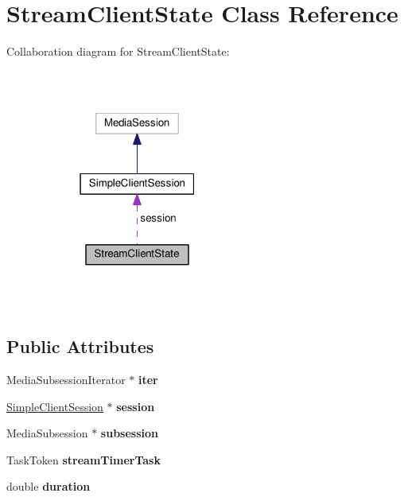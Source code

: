 \hypertarget{classStreamClientState}{}\section{Stream\+Client\+State Class Reference}
\label{classStreamClientState}


Collaboration diagram for Stream\+Client\+State\+:\nopagebreak
\begin{figure}[H]
\begin{center}
\leavevmode
\includegraphics[width=187pt]{classStreamClientState__coll__graph}
\end{center}
\end{figure}
\subsection*{Public Attributes}
\begin{DoxyCompactItemize}
\item 
Media\+Subsession\+Iterator $\ast$ {\bfseries iter}\hypertarget{classStreamClientState_aa21b46179817152e71673078ef8b1861}{}\label{classStreamClientState_aa21b46179817152e71673078ef8b1861}

\item 
\hyperlink{classSimpleClientSession}{Simple\+Client\+Session} $\ast$ {\bfseries session}\hypertarget{classStreamClientState_a01239436d89ee8c3866a711404d5f73a}{}\label{classStreamClientState_a01239436d89ee8c3866a711404d5f73a}

\item 
Media\+Subsession $\ast$ {\bfseries subsession}\hypertarget{classStreamClientState_a9537edef807552dd72e8680e59945b19}{}\label{classStreamClientState_a9537edef807552dd72e8680e59945b19}

\item 
Task\+Token {\bfseries stream\+Timer\+Task}\hypertarget{classStreamClientState_abb7105653c4e5e6b044f54b42d5829cb}{}\label{classStreamClientState_abb7105653c4e5e6b044f54b42d5829cb}

\item 
double {\bfseries duration}\hypertarget{classStreamClientState_a59a6522826f8370f1a9bd4abddb6201b}{}\label{classStreamClientState_a59a6522826f8370f1a9bd4abddb6201b}

\end{DoxyCompactItemize}


